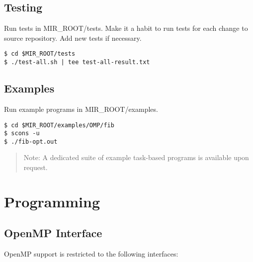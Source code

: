 \documentclass[11pt,a4paper]{article}
\begin{document}
\subsection{Testing}\label{testing}

Run tests in MIR\_ROOT/tests. Make it a habit to run tests for each change to
source repository. Add new tests if necessary.

\begin{lstlisting}[style=MyInputStyle]
$ cd $MIR_ROOT/tests
$ ./test-all.sh | tee test-all-result.txt
\end{lstlisting}

\subsection{Examples}\label{examples}

Run example programs in MIR\_ROOT/examples.

\begin{lstlisting}[style=MyInputStyle]
$ cd $MIR_ROOT/examples/OMP/fib
$ scons -u
$ ./fib-opt.out
\end{lstlisting}

\begin{framed}
\begin{quote}
Note: A dedicated suite of example task-based programs is available upon
    request.
\end{quote}
\end{framed}

\section{Programming}\label{programming}

\subsection{OpenMP Interface}\label{openmp-interface}

OpenMP support is restricted to the following interfaces:
\end{document}
